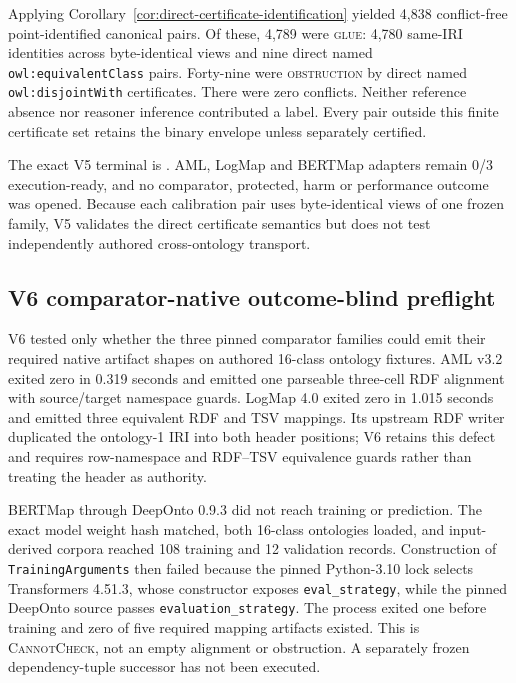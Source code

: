 Applying Corollary~\ref{cor:direct-certificate-identification} yielded 4,838
conflict-free point-identified canonical pairs. Of these, 4,789 were
\textsc{glue}: 4,780 same-IRI identities across byte-identical views and nine
direct named \texttt{owl:equivalentClass} pairs. Forty-nine were
\textsc{obstruction} by direct named \texttt{owl:disjointWith} certificates.
There were zero conflicts. Neither reference absence nor reasoner inference
contributed a label. Every pair outside this finite certificate set retains the
binary envelope unless separately certified.

The exact V5 terminal is
.
AML, LogMap and BERTMap adapters remain 0/3 execution-ready, and no comparator,
protected, harm or performance outcome was opened. Because each calibration
pair uses byte-identical views of one frozen family, V5 validates the direct
certificate semantics but does not test independently authored cross-ontology
transport.

\subsection{V6 comparator-native outcome-blind preflight}

V6 tested only whether the three pinned comparator families could emit their
required native artifact shapes on authored 16-class ontology fixtures.  AML
v3.2 exited zero in 0.319 seconds and emitted one parseable three-cell RDF
alignment with source/target namespace guards.  LogMap 4.0 exited zero in
1.015 seconds and emitted three equivalent RDF and TSV mappings.  Its upstream
RDF writer duplicated the ontology-1 IRI into both header positions; V6 retains
this defect and requires row-namespace and RDF--TSV equivalence guards rather
than treating the header as authority.

BERTMap through DeepOnto 0.9.3 did not reach training or prediction.  The exact
model weight hash matched, both 16-class ontologies loaded, and input-derived
corpora reached 108 training and 12 validation records.  Construction of
\texttt{TrainingArguments} then failed because the pinned Python-3.10 lock
selects Transformers 4.51.3, whose constructor exposes
\texttt{eval\_strategy}, while the pinned DeepOnto source passes
\texttt{evaluation\_strategy}.  The process exited one before training and
zero of five required mapping artifacts existed.  This is
\textsc{CannotCheck}, not an empty alignment or obstruction.  A separately frozen dependency-tuple successor has not been executed.

